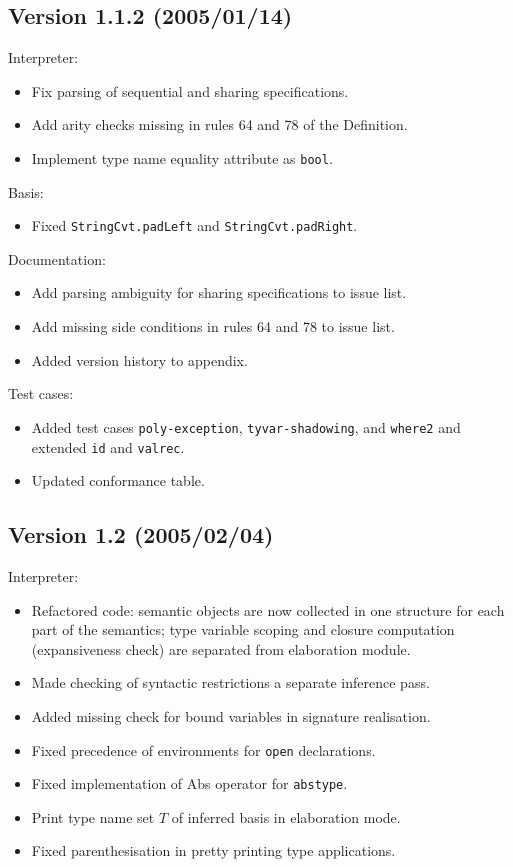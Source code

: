 \documentclass[twoside,titlepage]{article}
\begin{document}
\begin{appendix}
\subsection*{Version 1.1.2 (2005/01/14)}

Interpreter:
\begin{itemize}[nolistsep]
\item Fix parsing of sequential and sharing specifications.
\item Add arity checks missing in rules 64 and 78 of the Definition.
\item Implement type name equality attribute as {\tt bool}.
\end{itemize}

Basis:
\begin{itemize}[nolistsep]
\item Fixed {\tt StringCvt.padLeft} and {\tt StringCvt.padRight}.
\end{itemize}

Documentation:
\begin{itemize}[nolistsep]
\item Add parsing ambiguity for sharing specifications to issue list.
\item Add missing side conditions in rules 64 and 78 to issue list.
\item Added version history to appendix.
\end{itemize}

Test cases:
\begin{itemize}[nolistsep]
\item Added test cases {\tt poly-exception}, {\tt tyvar-shadowing}, and {\tt where2} and extended {\tt id} and {\tt valrec}.
\item Updated conformance table.
\end{itemize}

\subsection*{Version 1.2 (2005/02/04)}

Interpreter:
\begin{itemize}[nolistsep]
\item Refactored code: semantic objects are now collected in one structure for each part of the semantics; type variable scoping and closure computation (expansiveness check) are separated from elaboration module.
\item Made checking of syntactic restrictions a separate inference pass.
\item Added missing check for bound variables in signature realisation.
\item Fixed precedence of environments for {\tt open} declarations.
\item Fixed implementation of Abs operator for {\tt abstype}.
\item Print type name set $T$ of inferred basis in elaboration mode.
\item Fixed parenthesisation in pretty printing type applications.
\end{itemize}


\end{appendix}
\end{document}
